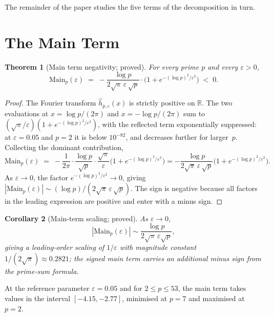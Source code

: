 \documentclass[11pt]{article}
\newtheorem{theorem}{Theorem}[section]
\newtheorem{corollary}[theorem]{Corollary}
\begin{document}
The remainder of the paper studies the five terms of the decomposition
in turn.

\section{The Main Term}
\label{sec:main}

\begin{theorem}[Main term negativity; proved]
\label{thm:main-neg}
For every prime $p$ and every $\varepsilon>0$,
\[
\mathrm{Main}_p(\varepsilon) \;=\; -\frac{\log p}{2\sqrt\pi\,\varepsilon\,\sqrt p}
\cdot\bigl(1 + e^{-(\log p)^2/\varepsilon^2}\bigr)
\;<\; 0.
\]
\end{theorem}

\begin{proof}
The Fourier transform $\widehat{h}_{p,\varepsilon}(x)$ is strictly
positive on $\mathbb R$.
The two evaluations at $x=\log p/(2\pi)$
and $x=-\log p/(2\pi)$ sum to $(\sqrt\pi/\varepsilon)
(1+e^{-(\log p)^2/\varepsilon^2})$,
with the reflected term exponentially suppressed: at
$\varepsilon=0.05$ and $p=2$ it is below $10^{-82}$, and decreases
further for larger~$p$.
Collecting the dominant contribution,
\[
\mathrm{Main}_p(\varepsilon) \;=\; -\frac{1}{2\pi}\cdot\frac{\log p}{\sqrt p}
\cdot\frac{\sqrt\pi}{\varepsilon}
\bigl(1 + e^{-(\log p)^2/\varepsilon^2}\bigr)
= -\frac{\log p}{2\sqrt\pi\,\varepsilon\,\sqrt p}
\bigl(1 + e^{-(\log p)^2/\varepsilon^2}\bigr).
\]
As $\varepsilon\to 0$, the factor $e^{-(\log p)^2/\varepsilon^2}\to 0$,
giving $|\mathrm{Main}_p(\varepsilon)|\sim
(\log p)/(2\sqrt\pi\,\varepsilon\,\sqrt p)$.
The sign is negative because all factors in the leading expression are
positive and enter with a minus sign.
\end{proof}

\begin{corollary}[Main-term scaling; proved]
\label{cor:main-scaling}
As $\varepsilon\to 0$,
\[
|\mathrm{Main}_p(\varepsilon)|\sim
\frac{\log p}{2\sqrt\pi\,\varepsilon\sqrt p},
\]
giving a leading-order scaling of $1/\varepsilon$ with magnitude
constant $1/(2\sqrt\pi)\approx 0.2821$;
the signed main term carries an additional minus sign from the prime-sum formula.
\end{corollary}

At the reference parameter $\varepsilon=0.05$ and for $2\le p\le 53$,
the main term takes values in the interval $[-4.15,-2.77]$, minimised
at $p=7$ and maximised at $p=2$.
\end{document}
